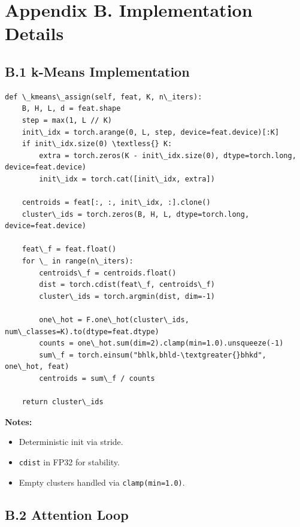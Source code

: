 
\section{Appendix B. Implementation Details}

\subsection{B.1 k-Means Implementation}

\begin{lstlisting}
def \_kmeans\_assign(self, feat, K, n\_iters):
    B, H, L, d = feat.shape
    step = max(1, L // K)
    init\_idx = torch.arange(0, L, step, device=feat.device)[:K]
    if init\_idx.size(0) \textless{} K:
        extra = torch.zeros(K - init\_idx.size(0), dtype=torch.long, device=feat.device)
        init\_idx = torch.cat([init\_idx, extra])

    centroids = feat[:, :, init\_idx, :].clone()
    cluster\_ids = torch.zeros(B, H, L, dtype=torch.long, device=feat.device)

    feat\_f = feat.float()
    for \_ in range(n\_iters):
        centroids\_f = centroids.float()
        dist = torch.cdist(feat\_f, centroids\_f)
        cluster\_ids = torch.argmin(dist, dim=-1)

        one\_hot = F.one\_hot(cluster\_ids, num\_classes=K).to(dtype=feat.dtype)
        counts = one\_hot.sum(dim=2).clamp(min=1.0).unsqueeze(-1)
        sum\_f = torch.einsum("bhlk,bhld-\textgreater{}bhkd", one\_hot, feat)
        centroids = sum\_f / counts

    return cluster\_ids
\end{lstlisting}

\textbf{Notes:}
\begin{itemize}
\item Deterministic init via stride.
\item \texttt{cdist} in FP32 for stability.
\item Empty clusters handled via \texttt{clamp(min=1.0)}.

\end{itemize}
\subsection{B.2 Attention Loop}

